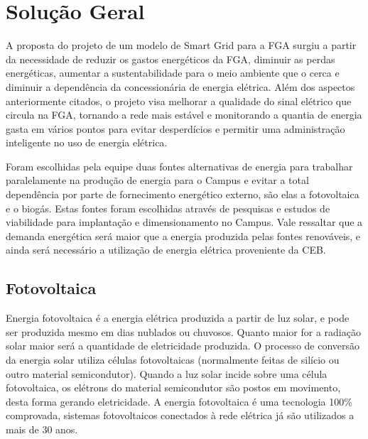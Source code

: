 \chapter[Solução Geral]{Solução Geral}

A proposta do projeto de um modelo de Smart Grid para a FGA surgiu a partir da necessidade de reduzir os gastos energéticos da FGA, diminuir as perdas energéticas, aumentar a sustentabilidade para o meio ambiente que o cerca e diminuir a dependência da concessionária de energia elétrica. Além dos aspectos anteriormente citados, o projeto visa melhorar a qualidade do sinal elétrico que circula na FGA, tornando a rede mais estável e monitorando a quantia de energia gasta em vários pontos para evitar desperdícios e permitir uma administração inteligente no uso de energia elétrica.

Foram escolhidas pela equipe duas fontes alternativas de energia para trabalhar paralelamente na produção de energia para o Campus e evitar a total dependência por parte de fornecimento energético externo, são elas a fotovoltaica e o biogás. Estas fontes foram escolhidas através de pesquisas e estudos de viabilidade para implantação e dimensionamento no Campus. Vale ressaltar que a demanda energética será maior que a energia produzida pelas fontes renováveis, e ainda será necessário a utilização de energia elétrica proveniente da CEB.

\section{Fotovoltaica}
Energia fotovoltaica é a energia elétrica produzida a partir de luz solar, e pode ser produzida mesmo em dias nublados ou chuvosos. Quanto maior for a radiação solar maior será a quantidade de eletricidade produzida. O processo de conversão da energia solar utiliza células fotovoltaicas (normalmente feitas de silício ou outro material semicondutor). Quando a luz solar incide sobre uma célula fotovoltaica, os elétrons do material semicondutor são postos em movimento, desta forma gerando eletricidade. A energia fotovoltaica é uma tecnologia 100\% comprovada, sistemas fotovoltaicos conectados à rede elétrica já são utilizados a mais de 30 anos.

